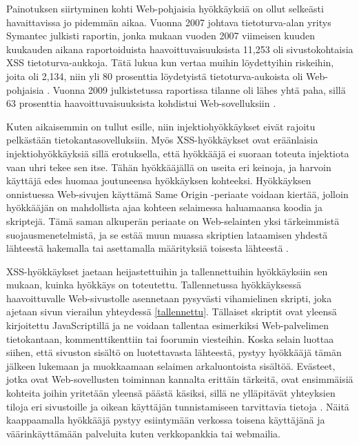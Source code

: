 Painotuksen siirtyminen kohti Web-pohjaisia hyökkäyksiä on ollut selkeästi havaittavissa jo pidemmän aikaa. Vuonna 2007 johtava tietoturva-alan 
yritys Symantec julkisti raportin, jonka  mukaan vuoden 2007 viimeisen kuuden kuukauden aikana raportoiduista haavoittuvaisuuksista 11,253
oli sivustokohtaisia XSS tietoturva-aukkoja. Tätä lukua kun vertaa muihin löydettyihin riskeihin, joita oli 2,134, niin 
yli 80 prosenttia löydetyistä tietoturva-aukoista oli Web-pohjaisia \cite{SYM}. Vuonna 2009 julkistetussa raportissa tilanne oli lähes yhtä paha, 
sillä 63 prosenttia haavoittuvaisuuksista kohdistui Web-sovelluksiin \cite{SYM2}.

Kuten aikaisemmin on tullut esille, niin injektiohyökkäykset eivät rajoitu pelkästään tietokantasovelluksiin. Myös XSS-hyökkäykset ovat eräänlaisia 
injektiohyökkäyksiä sillä erotuksella, että hyökkääjä ei suoraan toteuta injektiota vaan uhri tekee sen itse. Tähän hyökkääjällä on useita eri 
keinoja, ja harvoin käyttäjä edes huomaa joutuneensa hyökkäyksen kohteeksi. Hyökkäyksen onnistuessa Web-sivujen käyttämä Same Origin -pe\-ri\-aa\-te 
voidaan kiertää, jolloin hyökkääjän on mahdollista ajaa kohteen selaimessa haluamaansa koodia ja skriptejä. Tämä saman alkuperän periaate on Web-selainten 
yksi tärkeimmistä suojausmenetelmistä, ja se estää muun muassa skriptien lataamisen yhdestä lähteestä hakemalla tai asettamalla määrityksiä toisesta lähteestä \cite{WEB2}.

XSS-hyökkäykset jaetaan heijastettuihin ja tallennettuihin hyökkäyksiin sen mukaan, kuinka hyökkäys on toteutettu. Tallennetussa hyökkäyksessä haavoittuvalle 
Web-sivustolle asennetaan pysyvästi vihamielinen skripti, joka ajetaan sivun vierailun yhteydessä \ref{tallennettu}. Tällaiset skriptit ovat yleensä kirjoitettu JavaScriptillä
ja ne voidaan tallentaa esimerkiksi Web-palvelimen tietokantaan, kommenttikenttiin tai foorumin viesteihin. Koska selain luottaa siihen, 
että sivuston sisältö on luotettavasta lähteestä, pystyy hyökkääjä tämän jälkeen lukemaan ja muokkaamaan selaimen arkaluontoista sisältöä. Evästeet, jotka ovat Web-sovellusten 
toiminnan kannalta erittäin tärkeitä, ovat ensimmäisiä kohteita joihin yritetään yleensä päästä käsiksi, sillä ne ylläpitävät yhteyksien tiloja eri 
sivustoille ja oikean käyttäjän tunnistamiseen tarvittavia tietoja \cite{WEB2b}. Näitä kaappaamalla hyökkääjä pystyy esiintymään verkossa toisena käyttäjänä 
ja väärinkäyttämään palveluita kuten verkkopankkia tai webmailia. 

